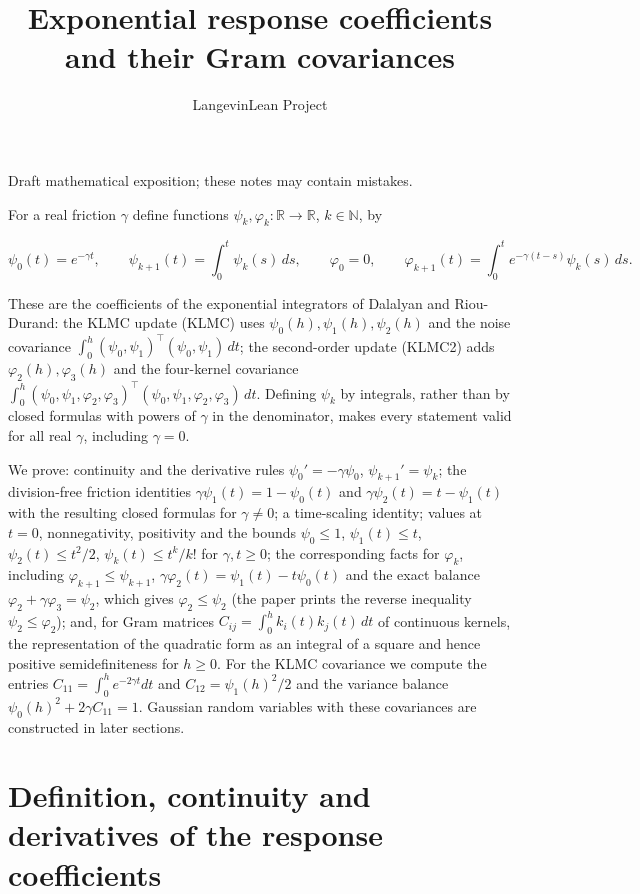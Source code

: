 \documentclass[11pt,a4paper]{article}
\title{\texorpdfstring{Exponential response coefficients and their Gram covariances}{Exponential response coefficients and their Gram covariances}}
\author{LangevinLean Project}
\date{}
\begin{document}
\maketitle
Draft mathematical exposition; these notes may contain mistakes.


For a real friction \(\gamma\) define functions \(\psi_k,\varphi_k:\mathbb R\to\mathbb R\), \(k\in\mathbb N\), by


\[\psi_0(t)=e^{-\gamma t},\qquad\psi_{k+1}(t)=\int_0^t\psi_k(s)\,ds,\qquad\varphi_0=0,\qquad\varphi_{k+1}(t)=\int_0^te^{-\gamma(t-s)}\psi_k(s)\,ds .\]


These are the coefficients of the exponential integrators of Dalalyan and Riou-Durand: the KLMC update (KLMC) uses \(\psi_0(h),\psi_1(h),\psi_2(h)\) and the noise covariance \(\int_0^h(\psi_0,\psi_1)^\top(\psi_0,\psi_1)\,dt\); the second-order update (KLMC2) adds \(\varphi_2(h),\varphi_3(h)\) and the four-kernel covariance \(\int_0^h(\psi_0,\psi_1,\varphi_2,\varphi_3)^\top(\psi_0,\psi_1,\varphi_2,\varphi_3)\,dt\). Defining \(\psi_k\) by integrals, rather than by closed formulas with powers of \(\gamma\) in the denominator, makes every statement valid for all real \(\gamma\), including \(\gamma=0\).




We prove: continuity and the derivative rules \(\psi_0'=-\gamma\psi_0\), \(\psi_{k+1}'=\psi_k\); the division-free friction identities \(\gamma\psi_1(t)=1-\psi_0(t)\) and \(\gamma\psi_2(t)=t-\psi_1(t)\) with the resulting closed formulas for \(\gamma\neq0\); a time-scaling identity; values at \(t=0\), nonnegativity, positivity and the bounds \(\psi_0\le1\), \(\psi_1(t)\le t\), \(\psi_2(t)\le t^2/2\), \(\psi_k(t)\le t^k/k!\) for \(\gamma,t\ge0\); the corresponding facts for \(\varphi_k\), including \(\varphi_{k+1}\le\psi_{k+1}\), \(\gamma\varphi_2(t)=\psi_1(t)-t\psi_0(t)\) and the exact balance \(\varphi_2+\gamma\varphi_3=\psi_2\), which gives \(\varphi_2\le\psi_2\) (the paper prints the reverse inequality \(\psi_2\le\varphi_2\)); and, for Gram matrices \(C_{ij}=\int_0^hk_i(t)k_j(t)\,dt\) of continuous kernels, the representation of the quadratic form as an integral of a square and hence positive semidefiniteness for \(h\ge0\). For the KLMC covariance we compute the entries \(C_{11}=\int_0^he^{-2\gamma t}dt\) and \(C_{12}=\psi_1(h)^2/2\) and the variance balance \(\psi_0(h)^2+2\gamma C_{11}=1\). Gaussian random variables with these covariances are constructed in later sections.


\section{\texorpdfstring{Definition, continuity and derivatives of the response coefficients}{Definition, continuity and derivatives of the response coefficients}}
\end{document}
